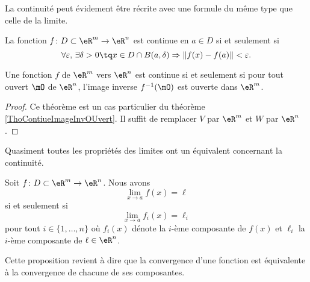La continuité peut évidement être récrite avec une formule du même type que celle de la limite.
\begin{proposition}
	La fonction $f\colon D\subset\eR^m\to \eR^n$ est continue en $a\in D$ si et seulement si
	\begin{equation}
		\forall\varepsilon,\,\exists\delta>0\tq x\in D\cap B(a,\delta)\Rightarrow \| f(x)-f(a) \|<\varepsilon.
	\end{equation}
\end{proposition}


\begin{theorem}
	Une fonction $f$ de $\eR^m$ vers $\eR^n$ est continue si et seulement si pour tout ouvert $\mO$ de $\eR^n$, l'image inverse $f^{-1}(\mO)$ est ouverte dans $\eR^m$.
\end{theorem}

\begin{proof}
	Ce théorème est un cas particulier du théorème \ref{ThoContiueImageInvOUvert}. Il suffit de remplacer $V$ par $\eR^m$ et $W$ par $\eR^n$.
\end{proof}

Quasiment toutes les propriétés des limites ont un équivalent concernant la continuité.
\begin{proposition}	\label{PropLimParcompos}
	Soit $f\colon D\subset\eR^m\to \eR^n$. Nous avons 
	\begin{equation}
		\lim_{x\to a} f(x)=\ell
	\end{equation}
	si et seulement si 
	\begin{equation}
		\lim_{x\to a} f_i(x)=\ell_i
	\end{equation}
	pour tout $i\in\{ 1,\ldots,n \}$ où $f_i(x)$ dénote la $i$-ème composante de $f(x)$ et $\ell_i$ la $i$-ème composante de $\ell\in\eR^n$.
\end{proposition}
Cette proposition revient à dire que la convergence d'une fonction est équivalente à la convergence de chacune de ses composantes.

